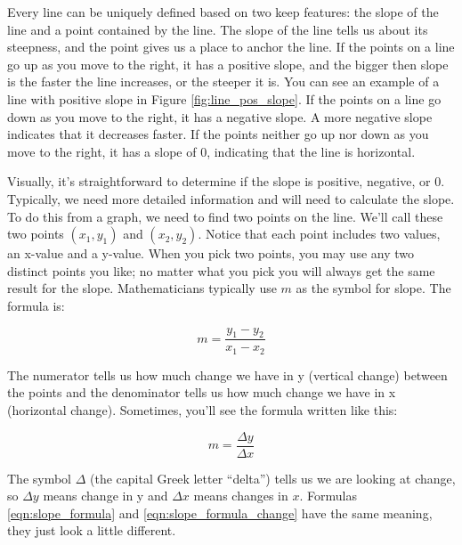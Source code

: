 



Every line can be uniquely defined based on two keep features: the slope of the line and a point contained by the line. The slope of the line tells us about its steepness, and the point gives us a  place to anchor the line. If the points on a line go up as you move to the right, it has a positive slope, and the bigger then slope is the faster the line increases, or the steeper it is. You can see an example of a line with positive slope in Figure \ref{fig:line_pos_slope}. If the points on a line go down as you move to the right, it has a negative slope. A more negative slope indicates that it decreases faster. If the points neither go up nor down as you move to the right, it has a slope of 0, indicating that the line is horizontal.

Visually, it's straightforward to determine if the slope is positive, negative, or 0. Typically, we need more detailed information and will need to calculate the slope. To do this from a graph, we need to find two points on the line. We'll call these two points $(x_1,y_1)$ and $(x_2,y_2)$. Notice that each point includes two values, an x-value and a y-value. When you pick two points, you may use any two distinct points you like; no matter what you pick you will always get the same result for the slope. Mathematicians typically use $m$ as the symbol for slope. The formula is:

\begin{equation}\label{eqn:slope_formula}
	m = \frac{y_1-y_2}{x_1-x_2}
\end{equation}


\noindent
The numerator tells us how much change we have in y (vertical change) between the points and the denominator tells us how much change we have in x (horizontal change). Sometimes, you'll see the formula written like this:

\begin{equation}\label{eqn:slope_formula_change}
	m = \frac{\Delta y}{\Delta x}
\end{equation}


\noindent
The symbol $\Delta$ (the capital Greek letter ``delta'') tells us we are looking at change, so $\Delta y$ means change in y and $\Delta x$ means changes in $x$. Formulas \ref{eqn:slope_formula} and \ref{eqn:slope_formula_change} have the same meaning, they just look a little different.

